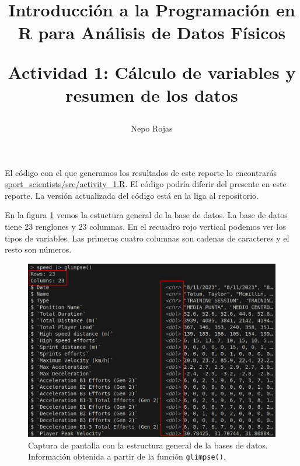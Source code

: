 

\author{Nepo Rojas}

\title{Introducción a la Programación en R para Análisis de Datos Físicos \\ \begin{large}
    Actividad 1: Cálculo de variables y resumen de los datos \end{large}}



\maketitle

El código con el que generamos los resultados de este reporte lo encontrarás
\href{https://github.com/niesfutbol/sport_scientists/blob/develop/src/activity_1.R}{sport\_scientists/src/activity\_1.R}.
El código podría diferir del presente en este reporte. La versión actualizada del código está en la
liga al repositorio.

En la figura \ref{fig:genralStructure} vemos la estuctura general de la base de datos. La base de 
datos tiene 23 renglones y 23 columnas. En el recuadro rojo vertical podemos ver los tipos de
variables. Las primeras cuatro columnas son cadenas de caracteres y el resto son números.
\begin{figure}[H]
    \centering
\includegraphics[scale=0.6]{../static/activity_1_2.png}
\caption{Captura de pantalla con la estructura general de la bases de datos. Información obtenida a 
partir de la función \texttt{glimpse()}.}
\label{fig:genralStructure}
\end{figure}

